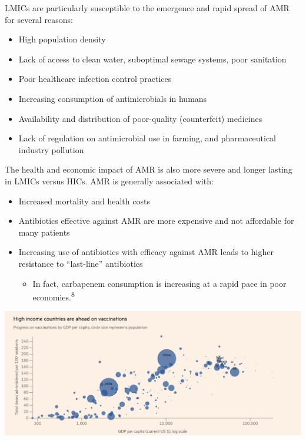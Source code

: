 \documentclass[
]{book}
\providecommand{\tightlist}{%
  \setlength{\itemsep}{0pt}\setlength{\parskip}{0pt}}
\begin{document}
LMICs are particularly susceptible to the emergence and rapid spread of AMR for several reasons:

\begin{itemize}
\tightlist
\item
  High population density
\item
  Lack of access to clean water, suboptimal sewage systems, poor sanitation
\item
  Poor healthcare infection control practices
\item
  Increasing consumption of antimicrobials in humans
\item
  Availability and distribution of poor-quality (counterfeit) medicines
\item
  Lack of regulation on antimicrobial use in farming, and pharmaceutical industry pollution
\end{itemize}

The health and economic impact of AMR is also more severe and longer lasting in LMICs versus HICs. AMR is generally associated with:

\begin{itemize}
\item
  Increased mortality and health costs
\item
  Antibiotics effective against AMR are more expensive and not affordable for many patients
\item
  Increasing use of antibiotics with efficacy against AMR leads to higher resistance to ``last-line'' antibiotics

  \begin{itemize}
  \item
    In fact, carbapenem consumption is increasing at a rapid pace in poor economies.\textsuperscript{8}
  \end{itemize}
\end{itemize}

\includegraphics[width=12.5in,height=\textheight]{images/ft_vaccine differences.png}
\end{document}
